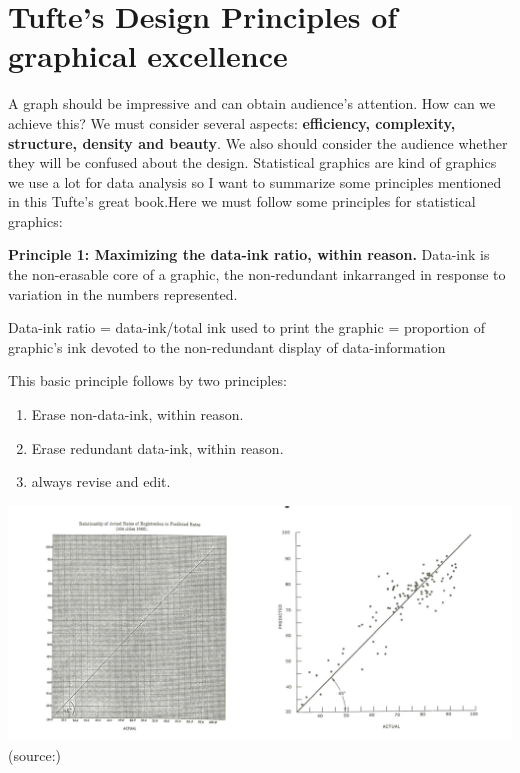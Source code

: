 \documentclass[]{book}
\providecommand{\tightlist}{%
  \setlength{\itemsep}{0pt}\setlength{\parskip}{0pt}}
\theoremstyle{definition}
\theoremstyle{definition}
\theoremstyle{definition}
\theoremstyle{remark}
\begin{document}
\section{Tufte's Design Principles of graphical
excellence}\label{tuftes-design-principles-of-graphical-excellence}

A graph should be impressive and can obtain audience's attention. How
can we achieve this? We must consider several aspects:
\textbf{efficiency, complexity, structure, density and beauty}. We also
should consider the audience whether they will be confused about the
design. Statistical graphics are kind of graphics we use a lot for data
analysis so I want to summarize some principles mentioned in this
Tufte's great book.Here we must follow some principles for statistical
graphics:

\textbf{Principle 1: Maximizing the data-ink ratio, within reason.}
Data-ink is the non-erasable core of a graphic, the non-redundant
inkarranged in response to variation in the numbers represented.

Data-ink ratio = data-ink/total ink used to print the graphic =
proportion of graphic's ink devoted to the non-redundant display of
data-information

This basic principle follows by two principles:

\begin{enumerate}
\def\labelenumi{\arabic{enumi}.}
\tightlist
\item
  Erase non-data-ink, within reason.
\item
  Erase redundant data-ink, within reason.
\item
  always revise and edit.
\end{enumerate}

\includegraphics{images/Tufte_figure1.png} (source:\citep{Tufte_2001})
\end{document}
